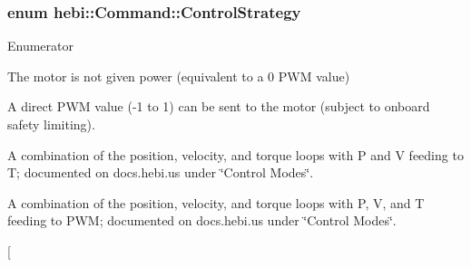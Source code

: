 \subsubsection[{\texorpdfstring{Control\+Strategy}{ControlStrategy}}]{\setlength{\rightskip}{0pt plus 5cm}enum {\bf hebi\+::\+Command\+::\+Control\+Strategy}}\hypertarget{classhebi_1_1Command_a0f4b41003c36dee21578caddb605c64a}{}\label{classhebi_1_1Command_a0f4b41003c36dee21578caddb605c64a}
\begin{Desc}
\item[Enumerator]\par
\begin{description}
\item[{\em 
Off\hypertarget{classhebi_1_1Command_a0f4b41003c36dee21578caddb605c64aafe98afde491faf74d257f008c2f68ee9}{}\label{classhebi_1_1Command_a0f4b41003c36dee21578caddb605c64aafe98afde491faf74d257f008c2f68ee9}
}]The motor is not given power (equivalent to a 0 P\+WM value) \item[{\em 
Direct\+P\+WM\hypertarget{classhebi_1_1Command_a0f4b41003c36dee21578caddb605c64aa4caa7bdaeb957f4d606344937eca082f}{}\label{classhebi_1_1Command_a0f4b41003c36dee21578caddb605c64aa4caa7bdaeb957f4d606344937eca082f}
}]A direct P\+WM value (-\/1 to 1) can be sent to the motor (subject to onboard safety limiting). \item[{\em 
Strategy2\hypertarget{classhebi_1_1Command_a0f4b41003c36dee21578caddb605c64aa46262e3b8b0440dcad719de382c8adda}{}\label{classhebi_1_1Command_a0f4b41003c36dee21578caddb605c64aa46262e3b8b0440dcad719de382c8adda}
}]A combination of the position, velocity, and torque loops with P and V feeding to T; documented on docs.\+hebi.\+us under \char`\"{}\+Control Modes\char`\"{}. \item[{\em 
Strategy3\hypertarget{classhebi_1_1Command_a0f4b41003c36dee21578caddb605c64aab04b6dd90ed193382865ff31530508dd}{}\label{classhebi_1_1Command_a0f4b41003c36dee21578caddb605c64aab04b6dd90ed193382865ff31530508dd}
}]A combination of the position, velocity, and torque loops with P, V, and T feeding to P\+WM; documented on docs.\+hebi.\+us under \char`\"{}\+Control Modes\char`\"{}. \item[{\em 
}
\end{description}
\end{Desc}
